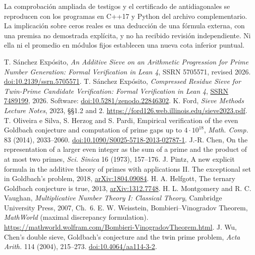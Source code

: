 \documentclass[11pt,a4paper]{article}
\newcommand{\B}[2]{#2}
\newcommand{\B}[2]{#1}
\begin{document}
\B{The extended witness audit and the antidiagonal certificate can be regenerated with the C++17 and Python programs in the companion archive. The real-zero implication is a deduction from an external formula, with an explicit unproved premise, and has not received independent referee review. Neither it nor the fixed-modulus average establishes a new target-pointwise lower bound.}{La comprobación ampliada de testigos y el certificado de antidiagonales se reproducen con los programas en C++17 y Python del archivo complementario. La implicación sobre ceros reales es una deducción de una fórmula externa, con una premisa no demostrada explícita, y no ha recibido revisión independiente. Ni ella ni el promedio en módulos fijos establecen una nueva cota inferior puntual.}

\begin{thebibliography}{99}\small{}
 T. Sánchez Expósito, \emph{An Additive Sieve on an Arithmetic Progression for Prime Number Generation: Formal Verification in Lean 4}, SSRN 5705571, revised 2026. \href{https://doi.org/10.2139/ssrn.5705571}{doi:10.2139/ssrn.5705571}.
 T. Sánchez Expósito, \emph{Compressed Residue Sieve for Twin-Prime Candidate Verification: Formal Verification in Lean 4}, \href{https://papers.ssrn.com/sol3/papers.cfm?abstract_id=7489199}{SSRN 7489199}, 2026. Software: \href{https://doi.org/10.5281/zenodo.22846302}{doi:10.5281/zenodo.22846302}.
 K. Ford, \emph{Sieve Methods Lecture Notes}, 2023, §§1.2 and 2. \url{https://ford126.web.illinois.edu/sieve2023.pdf}.
 T. Oliveira e Silva, S. Herzog and S. Pardi, Empirical verification of the even Goldbach conjecture and computation of prime gaps up to $4\cdot10^{18}$, \emph{Math. Comp.} 83 (2014), 2033--2060. \href{https://doi.org/10.1090/S0025-5718-2013-02787-1}{doi:10.1090/S0025-5718-2013-02787-1}.
 J.-R. Chen, On the representation of a larger even integer as the sum of a prime and the product of at most two primes, \emph{Sci. Sinica} 16 (1973), 157--176.
 J. Pintz, A new explicit formula in the additive theory of primes with applications II. The exceptional set in Goldbach's problem, 2018, \href{https://arxiv.org/abs/1804.09084}{arXiv:1804.09084}.
 H. A. Helfgott, The ternary Goldbach conjecture is true, 2013, \href{https://arxiv.org/abs/1312.7748}{arXiv:1312.7748}.
 H. L. Montgomery and R. C. Vaughan, \emph{Multiplicative Number Theory I: Classical Theory}, Cambridge University Press, 2007, Ch.~6.
 E. W. Weisstein, Bombieri--Vinogradov Theorem, \emph{MathWorld} (maximal discrepancy formulation). \url{https://mathworld.wolfram.com/Bombieri-VinogradovTheorem.html}.
 J. Wu, Chen's double sieve, Goldbach's conjecture and the twin prime problem, \emph{Acta Arith.} 114 (2004), 215--273. \href{https://doi.org/10.4064/aa114-3-2}{doi:10.4064/aa114-3-2}.


\end{thebibliography}
\end{document}
